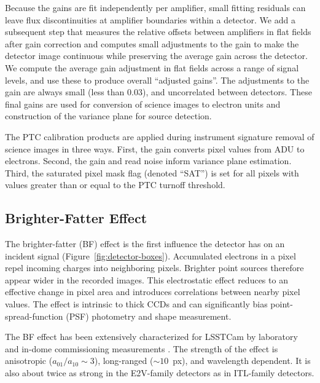 Because the gains are fit independently per amplifier, small fitting residuals can leave flux discontinuities at amplifier boundaries within a detector.
We add a subsequent step that measures the relative offsets between amplifiers in flat fields after gain correction and computes small adjustments to the gain to make the detector image continuous while preserving the average gain across the detector.
We compute the average gain adjustment in flat fields across a range of signal levels, and use these to produce overall ``adjusted gains''.
The adjustments to the gain are always small (less than 0.03), and uncorrelated between detectors.
These final gains are used for conversion of science images to electron units and construction of the variance plane for source detection.

The PTC calibration products are applied during instrument signature removal of science images in three ways.
First, the gain converts pixel values from ADU to electrons.
Second, the gain and read noise inform variance plane estimation.
Third, the saturated pixel mask flag (denoted ``SAT'') is set for all pixels with values greater than or equal to the PTC turnoff threshold.



\subsection{Brighter-Fatter Effect} \label{sec:processing:calibration:bf}

The brighter-fatter (BF) effect is the first influence the detector has on an incident signal (Figure~\ref{fig:detector-boxes}).
Accumulated electrons in a pixel repel incoming charges into neighboring pixels.
Brighter point sources therefore appear wider in the recorded images.
This electrostatic effect reduces to an effective change in pixel area and introduces correlations between nearby pixel values.
The effect is intrinsic to thick CCDs and can significantly bias point-spread-function (PSF) photometry and shape measurement.

The BF effect has been extensively characterized for LSSTCam by laboratory and in-dome commissioning measurements \citep{2024PASP..136d5003B}.
The strength of the effect is anisotropic ($a_{01}/a_{10} \sim 3$), long-ranged ($\sim 10$~px), and wavelength dependent.
It is also about twice as strong in the E2V-family detectors as in ITL-family detectors.


